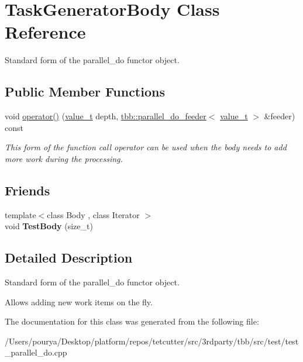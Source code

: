\hypertarget{classTaskGeneratorBody}{}\section{Task\+Generator\+Body Class Reference}
\label{classTaskGeneratorBody}


Standard form of the parallel\+\_\+do functor object.  


\subsection*{Public Member Functions}
\begin{DoxyCompactItemize}
\item 
\hypertarget{classTaskGeneratorBody_a25f246a6c1433a93566b37098323036f}{}void \hyperlink{classTaskGeneratorBody_a25f246a6c1433a93566b37098323036f}{operator()} (\hyperlink{classvalue__t}{value\+\_\+t} depth, \hyperlink{classtbb_1_1parallel__do__feeder}{tbb\+::parallel\+\_\+do\+\_\+feeder}$<$ \hyperlink{classvalue__t}{value\+\_\+t} $>$ \&feeder) const \label{classTaskGeneratorBody_a25f246a6c1433a93566b37098323036f}

\begin{DoxyCompactList}\small\item\em This form of the function call operator can be used when the body needs to add more work during the processing. \end{DoxyCompactList}\end{DoxyCompactItemize}
\subsection*{Friends}
\begin{DoxyCompactItemize}
\item 
\hypertarget{classTaskGeneratorBody_a8082e6f37a4b79c5939f89de418f9205}{}{\footnotesize template$<$class Body , class Iterator $>$ }\\void {\bfseries Test\+Body} (size\+\_\+t)\label{classTaskGeneratorBody_a8082e6f37a4b79c5939f89de418f9205}

\end{DoxyCompactItemize}


\subsection{Detailed Description}
Standard form of the parallel\+\_\+do functor object. 

Allows adding new work items on the fly. 

The documentation for this class was generated from the following file\+:\begin{DoxyCompactItemize}
\item 
/\+Users/pourya/\+Desktop/platform/repos/tetcutter/src/3rdparty/tbb/src/test/test\+\_\+parallel\+\_\+do.\+cpp\end{DoxyCompactItemize}
